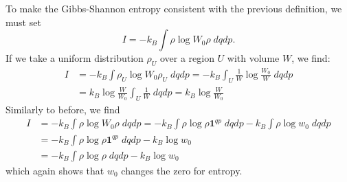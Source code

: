 To make the Gibbs-Shannon entropy consistent with the previous definition, we must set
\begin{equation}
	I = - k_B \int \rho \log W_0 \rho \; dq dp.
\end{equation}
If we take a uniform distribution $\rho_U$ over a region $U$ with volume $W$, we find:
\begin{equation}
	\begin{aligned}
		I &= - k_B \int \rho_U \log W_0 \rho_U \; dq dp = - k_B \int_{U} \frac{1}{W} \log \frac{W_0}{W} \; dq dp \\
		&= k_B \log \frac{W}{W_0} \int_{U} \frac{1}{W} \; dq dp = k_B \log \frac{W}{W_0}
	\end{aligned}
\end{equation}
Similarly to before, we find
\begin{equation}
	\begin{aligned}
	I &= - k_B \int \rho \log W_0 \rho \; dq dp = - k_B \int \rho \log \rho \textbf{1}^{qp} \; dq dp - k_B \int \rho \log w_0 \; dq dp \\
	&= - k_B \int \rho \log \rho \textbf{1}^{qp} \; dq dp - k_B \log w_0 \\
	&= - k_B \int \rho \log \rho \; dq dp - k_B \log w_0
	\end{aligned}
\end{equation}
which again shows that $w_0$ changes the zero for entropy.

